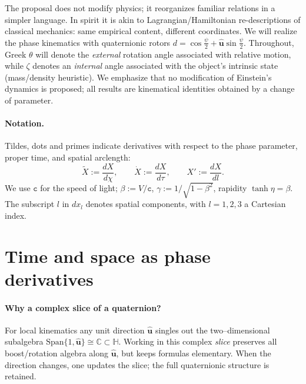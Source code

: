 \documentclass[11pt]{article}
\numberwithin{equation}{section}
\providecommand{\uhat}{\hat{\mathbf u}}
\begin{document}
The proposal does not modify physics; it reorganizes familiar relations in a simpler language. In spirit it is akin to Lagrangian/Hamiltonian re-descriptions of classical mechanics: same empirical content, different coordinates. We will realize the phase kinematics with quaternionic rotors $d=\cos\tfrac{\psi}{2}+\hat{\mathbf u}\sin\tfrac{\psi}{2}$. Throughout, Greek $\theta$ will denote the \emph{external} rotation angle associated with relative motion, while $\zeta$ denotes an \emph{internal} angle associated with the object's intrinsic state (mass/density heuristic). We emphasize that no modification of Einstein's dynamics is proposed; all results are kinematical identities obtained by a change of parameter.

\paragraph{Notation.} Tildes, dots and primes indicate derivatives with respect to the phase parameter, proper time, and spatial arclength:
\[
\tilde{X}:=\frac{dX}{d\chi},\qquad \dot{X}:=\frac{dX}{d\tau},\qquad X':=\frac{dX}{dl}.
\]
We use $\mathtt{c}$ for the speed of light; $\beta:=V/\mathtt{c}$, $\gamma:=1/\sqrt{1-\beta^2}$, rapidity $\tanh\eta=\beta$. The subscript $l$ in $dx_l$ denotes spatial components, with $l=1,2,3$ a Cartesian index.

\section{Time and space as phase derivatives}

\paragraph{Why a complex slice of a quaternion?}
For local kinematics any unit direction $\uhat$ singles out the two--dimensional subalgebra
$\mathrm{Span}\{1,\uhat\}\cong\mathbb{C}\subset\mathbb{H}$. Working in this complex
\emph{slice} preserves all boost/rotation algebra along $\uhat$, but keeps formulas
elementary. When the direction changes, one updates the slice; the full quaternionic
structure is retained.
\end{document}
